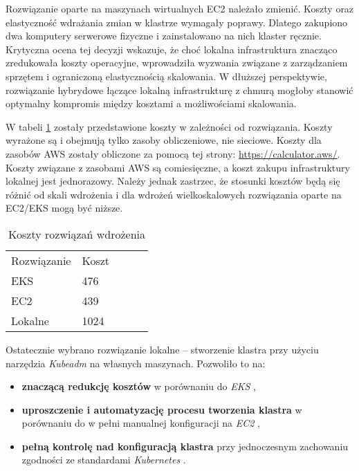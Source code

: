 \newpage

Rozwiązanie oparte na maszynach wirtualnych EC2 należało zmienić. Koszty oraz elastyczność wdrażania zmian w klastrze wymagały poprawy. Dlatego zakupiono dwa komputery serwerowe fizyczne i zainstalowano na nich klaster ręcznie. Krytyczna ocena tej decyzji wskazuje, że choć lokalna infrastruktura znacząco zredukowała koszty operacyjne, wprowadziła wyzwania związane z zarządzaniem sprzętem i ograniczoną elastycznością skalowania. W dłuższej perspektywie, rozwiązanie hybrydowe łączące lokalną infrastrukturę z chmurą mogłoby stanowić optymalny kompromis między kosztami a możliwościami skalowania.

W tabeli \ref{tab:koszty_rozwiazan_wdrazenia} zostały przedstawione koszty w zależności od rozwiązania. Koszty wyrażone są i obejmują tylko zasoby obliczeniowe, nie sieciowe. Koszty dla zasobów AWS zostały obliczone za pomocą tej strony: \url{https://calculator.aws/}. Koszty związane z zasobami AWS są comiesięczne, a koszt zakupu infrastruktury lokalnej jest jednorazowy. Należy jednak zastrzec, że stosunki kosztów będą się różnić od skali wdrożenia i dla wdrożeń wielkoskalowych rozwiązania oparte na EC2/EKS mogą być niższe.

\begin{table}[h]
    \centering
    \begin{tabular}{|l|l|lll}
    \cline{1-2}
    Rozwiązanie & Koszt &  &  &  \\ \cline{1-2}
    EKS         & 476   &  &  &  \\ \cline{1-2}
    EC2         & 439   &  &  &  \\ \cline{1-2}
    Lokalne     & 1024  &  &  &  \\ \cline{1-2}
    \end{tabular}
    \caption{Koszty rozwiązań wdrożenia}
    \label{tab:koszty_rozwiazan_wdrazenia}
\end{table}

\vspace{0.3em}

Ostatecznie wybrano rozwiązanie lokalne – stworzenie klastra przy użyciu narzędzia \textit{Kubeadm} \cite{kubeadm_docs} na własnych maszynach. Pozwoliło to na:
\begin{itemize}
    \item \textbf{znaczącą redukcję kosztów} w porównaniu do \textit{EKS} \cite{eks_docs},
    \item \textbf{uproszczenie i automatyzację procesu tworzenia klastra} w porównaniu do w pełni manualnej konfiguracji na \textit{EC2} \cite{ec2_docs},
    \item \textbf{pełną kontrolę nad konfiguracją klastra} przy jednoczesnym zachowaniu zgodności ze standardami \textit{Kubernetes} \cite{kubernetes}.
\end{itemize}

